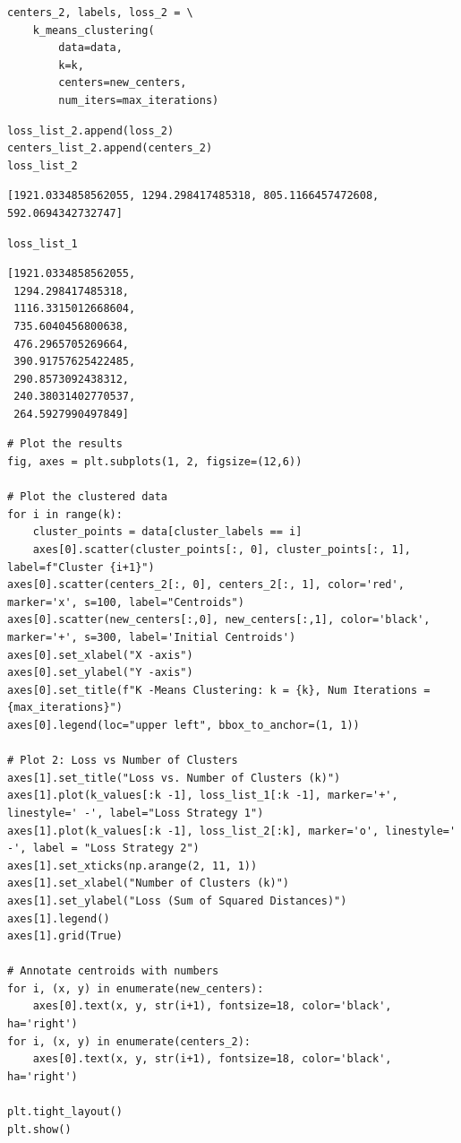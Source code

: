 \begin{verbatim}
centers_2, labels, loss_2 = \
    k_means_clustering(
        data=data,
        k=k,
        centers=new_centers,
        num_iters=max_iterations)
\end{verbatim}

\begin{verbatim}
loss_list_2.append(loss_2)
centers_list_2.append(centers_2)
loss_list_2
\end{verbatim}

\begin{verbatim}
[1921.0334858562055, 1294.298417485318, 805.1166457472608, 592.0694342732747]
\end{verbatim}

\begin{verbatim}
loss_list_1
\end{verbatim}

\begin{verbatim}
[1921.0334858562055,
 1294.298417485318,
 1116.3315012668604,
 735.6040456800638,
 476.2965705269664,
 390.91757625422485,
 290.8573092438312,
 240.38031402770537,
 264.5927990497849]
\end{verbatim}

\begin{verbatim}
# Plot the results
fig, axes = plt.subplots(1, 2, figsize=(12,6))

# Plot the clustered data
for i in range(k):
    cluster_points = data[cluster_labels == i]
    axes[0].scatter(cluster_points[:, 0], cluster_points[:, 1], label=f"Cluster {i+1}")
axes[0].scatter(centers_2[:, 0], centers_2[:, 1], color='red', marker='x', s=100, label="Centroids")
axes[0].scatter(new_centers[:,0], new_centers[:,1], color='black', marker='+', s=300, label='Initial Centroids')
axes[0].set_xlabel("X -axis")
axes[0].set_ylabel("Y -axis")
axes[0].set_title(f"K -Means Clustering: k = {k}, Num Iterations = {max_iterations}")
axes[0].legend(loc="upper left", bbox_to_anchor=(1, 1))

# Plot 2: Loss vs Number of Clusters
axes[1].set_title("Loss vs. Number of Clusters (k)")
axes[1].plot(k_values[:k -1], loss_list_1[:k -1], marker='+', linestyle=' -', label="Loss Strategy 1")
axes[1].plot(k_values[:k -1], loss_list_2[:k], marker='o', linestyle=' -', label = "Loss Strategy 2")
axes[1].set_xticks(np.arange(2, 11, 1))
axes[1].set_xlabel("Number of Clusters (k)")
axes[1].set_ylabel("Loss (Sum of Squared Distances)")
axes[1].legend()
axes[1].grid(True)

# Annotate centroids with numbers
for i, (x, y) in enumerate(new_centers):
    axes[0].text(x, y, str(i+1), fontsize=18, color='black', ha='right')
for i, (x, y) in enumerate(centers_2):
    axes[0].text(x, y, str(i+1), fontsize=18, color='black', ha='right')

plt.tight_layout()
plt.show()
\end{verbatim}

